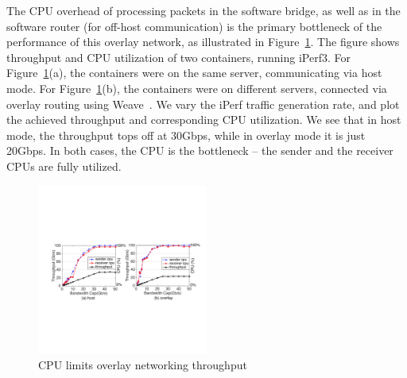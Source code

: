 The CPU overhead of processing packets in the software bridge, as well as in the
software router (for off-host communication) is the primary bottleneck of the
performance of this overlay network, as illustrated in
Figure~\ref{fig:mot_bw_cpu}. The figure shows throughput and CPU utilization of
two containers, running iPerf3. For Figure~\ref{fig:mot_bw_cpu}(a), the
containers were on the same server, communicating via host mode. For
Figure~\ref{fig:mot_bw_cpu}(b), the containers were on different servers,
connected via overlay routing using Weave~\cite{weave}. We vary the iPerf
traffic generation rate, and plot the achieved throughput and corresponding CPU
utilization. We see that in host mode, the throughput tops off at 30Gbps, while
in overlay mode it is just 20Gbps. In both cases, the CPU is the bottleneck --
the sender and the receiver CPUs are fully utilized.

\begin{figure}[t]
\centering 
\includegraphics[width=0.5\textwidth]{figures/motivation/mot_bw_cpu2.pdf} 
\caption{\label{fig:mot_bw_cpu}CPU limits overlay networking throughput}
\end{figure}
